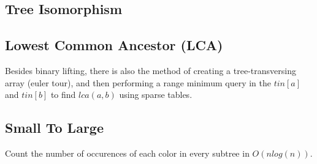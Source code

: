 
\subsection{Tree Isomorphism}

\vspace{10pt}


\subsection{Lowest Common Ancestor (LCA)}
	Besides binary lifting, there is also the method of creating a tree-transversing array (euler tour),
	and then performing a range minimum query in the $tin[a]$ and $tin[b]$ to find $lca(a, b)$ using sparse tables.



\subsection{Small To Large}

	Count the number of occurences of each color in every subtree in $O(n log(n))$.

